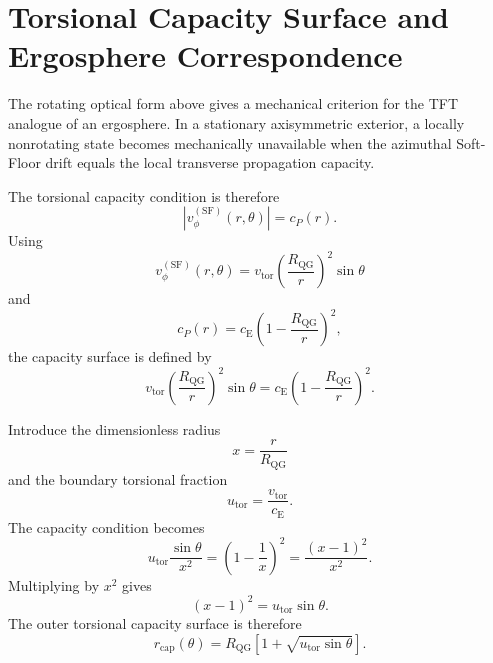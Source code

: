 \section{Torsional Capacity Surface and Ergosphere Correspondence}

The rotating optical form above gives a mechanical criterion for the TFT analogue of an ergosphere. In a stationary axisymmetric exterior, a locally nonrotating state becomes mechanically unavailable when the azimuthal Soft-Floor drift equals the local transverse propagation capacity.

The torsional capacity condition is therefore
\begin{equation}
    \left|
    v_{\phi}^{(\mathrm{SF})}(r,\theta)
    \right|
    =
    c_P(r).
\end{equation}
Using
\begin{equation}
    v_{\phi}^{(\mathrm{SF})}(r,\theta)
    =
    v_{\mathrm{tor}}
    \left(
    \frac{R_{\mathrm{QG}}}{r}
    \right)^2
    \sin\theta
\end{equation}
and
\begin{equation}
    c_P(r)
    =
    c_{\mathrm{E}}
    \left(
    1-
    \frac{R_{\mathrm{QG}}}{r}
    \right)^2,
\end{equation}
the capacity surface is defined by
\begin{equation}
    v_{\mathrm{tor}}
    \left(
    \frac{R_{\mathrm{QG}}}{r}
    \right)^2
    \sin\theta
    =
    c_{\mathrm{E}}
    \left(
    1-
    \frac{R_{\mathrm{QG}}}{r}
    \right)^2 .
\end{equation}

Introduce the dimensionless radius
\begin{equation}
    x
    =
    \frac{r}{R_{\mathrm{QG}}}
\end{equation}
and the boundary torsional fraction
\begin{equation}
    u_{\mathrm{tor}}
    =
    \frac{v_{\mathrm{tor}}}{c_{\mathrm{E}}} .
\end{equation}
The capacity condition becomes
\begin{equation}
    u_{\mathrm{tor}}
    \frac{\sin\theta}{x^2}
    =
    \left(
    1-
    \frac{1}{x}
    \right)^2
    =
    \frac{(x-1)^2}{x^2} .
\end{equation}
Multiplying by \(x^2\) gives
\begin{equation}
    (x-1)^2
    =
    u_{\mathrm{tor}}\sin\theta .
\end{equation}
The outer torsional capacity surface is therefore
\begin{equation}
    r_{\mathrm{cap}}(\theta)
    =
    R_{\mathrm{QG}}
    \left[
    1
    +
    \sqrt{
    u_{\mathrm{tor}}\sin\theta
    }
    \right].
\end{equation}


